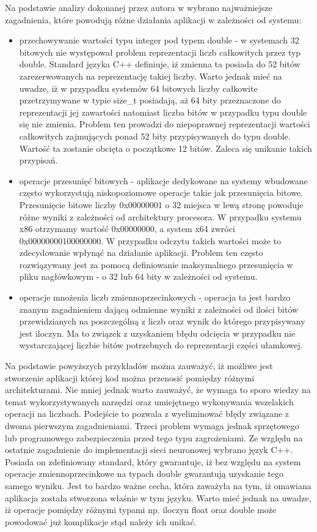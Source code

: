 Na podstawie analizy dokonanej przez autora w wybrano najważniejsze zagadnienia, które powodują różne działania aplikacji w zależności od systemu:
\begin{itemize}
	\item przechowywanie wartości typu integer pod typem double - w systemach 32 bitowych nie występował problem reprezentacji liczb całkowitych przez typ double. Standard języka C++ definiuje, iż zmienna ta posiada do 52 bitów zarezerwowanych na reprezentację takiej liczby. Warto jednak mieć na uwadze, iż w przypadku systemów 64 bitowych liczby całkowite przetrzymywane w typie size\_t posiadają, aż 64 bity przeznaczone do reprezentacji jej zawartości natomiast liczba bitów w przypadku typu double się nie zmienia. Problem ten prowadzi do niepoprawnej reprezentacji wartości całkowitych zajmujących ponad 52 bity przypisywanych do typu double. Wartość ta zostanie obcięta o początkowe 12 bitów. Zaleca się unikanie takich przypisań.
	
	\item operacje przesunięć bitowych - aplikacje dedykowane na systemy wbudowane często wykorzystują niskopoziomowe operacje takie jak przesunięcia bitowe. Przesunięcie bitowe liczby 0x00000001 o 32 miejsca w lewą stronę powoduje różne wyniki z zależności od architektury procesora. W przypadku systemu x86 otrzymamy wartość 0x00000000, a system x64 zwróci 0x00000000100000000. W przypadku odczytu takich wartości może to zdecydowanie wpłynąć na działanie aplikacji. Problem ten często rozwiązywany jest za pomocą definiowanie maksymalnego przesunięcia w pliku nagłówkowym - o 32 lub 64 bity w zależności od systemu.
	
	\item operacje mnożenia liczb zmiennoprzecinkowych -  operacja ta jest bardzo znanym zagadnieniem dającą odmienne wyniki z zależności od ilości bitów przewidzianych na poszczególną z liczb oraz wynik do którego przypisywany jest iloczyn. Ma to związek z uzyskaniem błędu odcięcia w przypadku nie wystarczającej liczbie bitów potrzebnych do reprezentacji części ułamkowej.
\end{itemize}

Na podstawie powyższych przykładów można zauważyć, iż możliwe jest stworzenie aplikacji której kod można przenosić pomiędzy różnymi architekturami. Nie mniej jednak warto zauważyć, że wymaga to sporo wiedzy na temat wykorzystywanych narzędzi oraz umiejętnego wykonywania wszelakich operacji na liczbach. Podejście to pozwala z wyeliminować błędy związane z dwoma pierwszym zagadnieniami. Trzeci problem wymaga jednak sprzętowego lub programowego zabezpieczenia przed tego typu zagrożeniami. Ze względu na ostatnie zagadnienie do implementacji sieci neuronowej wybrano język C++. Posiada on zdefiniowany standard, który gwarantuje, iż bez względu na system operacje zmiennoprzecinkowe na typach double gwarantują uzyskanie tego samego wyniku. Jest to bardzo ważne cecha, która zaważyła na tym, iż omawiana aplikacja została stworzona właśnie w tym języku. Warto mieć jednak na uwadze, iż operacje pomiędzy różnymi typami np. iloczyn float oraz double może powodować już komplikacje stąd należy ich unikać.

